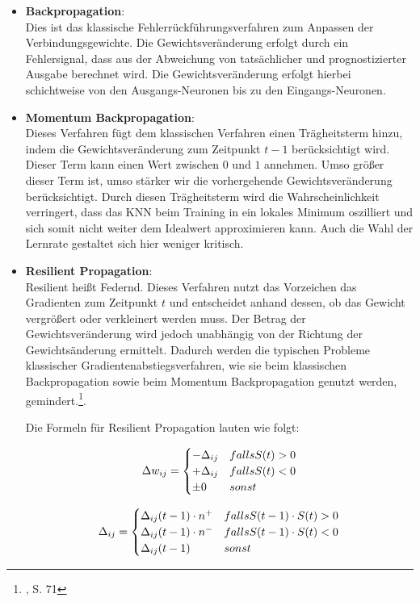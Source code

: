 \begin{itemize}
\item \textbf{Backpropagation}:\\
Dies ist das klassische Fehlerrückführungsverfahren zum Anpassen der Verbindungsgewichte. Die Gewichtsveränderung erfolgt durch ein Fehlersignal, dass aus der Abweichung von tatsächlicher und prognostizierter Ausgabe berechnet wird. Die Gewichtsveränderung erfolgt hierbei schichtweise von den Ausgangs-Neuronen bis zu den Eingangs-Neuronen.

\item \textbf{Momentum Backpropagation}:\\
Dieses Verfahren fügt dem klassischen Verfahren einen Trägheitsterm hinzu, indem die Gewichtsveränderung zum Zeitpunkt $t-1$ berücksichtigt wird. Dieser Term kann einen Wert zwischen $0$ und $1$ annehmen. Umso größer dieser Term ist, umso stärker wir die vorhergehende Gewichtsveränderung berücksichtigt. Durch diesen Trägheitsterm wird die Wahrscheinlichkeit verringert, dass das KNN beim Training in ein lokales Minimum oszilliert und sich somit nicht weiter dem Idealwert approximieren kann. Auch die Wahl der Lernrate gestaltet sich hier weniger kritisch. 

\item \textbf{Resilient Propagation}:\\
Resilient heißt Federnd. Dieses Verfahren nutzt das Vorzeichen das Gradienten zum Zeitpunkt $t$ und entscheidet anhand dessen, ob das Gewicht vergrößert oder verkleinert werden muss. Der Betrag der Gewichtsveränderung wird jedoch unabhängig von der Richtung der Gewichtsänderung ermittelt.  Dadurch werden die typischen Probleme klassischer Gradientenabstiegsverfahren, wie sie beim klassischen Backpropagation sowie beim Momentum Backpropagation genutzt werden, gemindert.\footnote{\Vgl{}, S. 71}.

Die Formeln für Resilient Propagation lauten wie folgt:

\begin{equation}\formelentry{Formel zur Bestimmung der Art der Gewichtsänderung}
\Delta w_{ij}=\begin{cases} 
-\Delta_{ij} & falls S(t) > 0 \\ 
+\Delta_{ij} & falls S(t) < 0  \\ 
\pm 0       & sonst 
\end{cases}
\end{equation}

\begin{equation}\formelentry{Formel zur Bestimmung des Betrages der Gewichtsänderung}
\Delta_{ij}=\begin{cases} 
\Delta_{ij}(t-1)\cdot n^+ & falls S(t-1) \cdot S(t) > 0 \\ 
\Delta_{ij}(t-1)\cdot n^- & falls S(t-1) \cdot S(t) < 0 \\
\Delta_{ij}(t-1)       & sonst 
\end{cases}
\end{equation}



\end{itemize}
